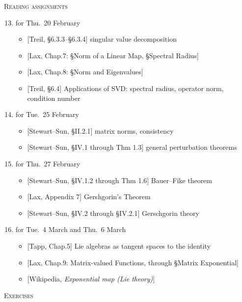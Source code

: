 \documentclass[11pt]{article}
\newcommand\total[2]{\marginpar{\colorbox{yellow}{\huge #1/#2}}}
\newcommand\0{\mathbf{0}}
\newcommand\<{\langle}
\renewcommand\>{\rangle}
\begin{document}
\noindent
\textsc{Reading assignments}\total{33}{42}%
\begin{enumerate}[itemsep=-1ex]\setcounter{enumi}{12}
\item%
for Thu.~20 February
  \begin{itemize}
  \item{}%
  [Treil, \S 6.3.3--\S 6.3.4] singular value decomposition
  \item{}%
  [Lax, Chap.7: \S Norm of a Linear Map, \S Spectral Radius]
  \item{}%
  [Lax, Chap.8: \S Norm and Eigenvalues]
  \item{}%
  [Treil, \S 6.4] Applications of SVD: spectral radius, operator norm,
  condition number
  \end{itemize}

\item%
for Tue.~25 February
  \begin{itemize}
  \item{}%
  [Stewart--Sun, \S II.2.1] matrix norms, consistency
  \item{}%
  [Stewart--Sun, \S IV.1 through Thm 1.3] general perturbation theorems
  \end{itemize}

\item%
for Thu.~27 February
  \begin{itemize}
  \item{}%
  [Stewart--Sun, \S IV.1.2 through Thm 1.6] Bauer--Fike theorem
  \item{}%
  [Lax, Appendix 7] Gershgorin's Theorem
  \item{}%
  [Stewart--Sun, \S IV.2 through \S IV.2.1] Gerschgorin theory
  \end{itemize}

\item[16--17.]\addtocounter{enumi}{2}%
for Tue.~4 March and Thu.~6 March
  \begin{itemize}
  \item{}%
  [Tapp, Chap.5] Lie algebras as tangent spaces to the identity
  \item{}%
  [Lax, Chap.9: Matrix-valued Functions, through \S Matrix Exponential]
  \item{}%
  [Wikipedia, \emph{Exponential map (Lie theory)}]
  \end{itemize}
\end{enumerate}

\noindent
\textsc{Exercises}%
\end{document}

